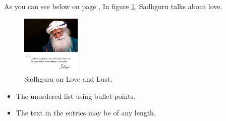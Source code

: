 \documentclass[12pt, letterpaper, twoside]{article}
\begin{document}
As you can see below on page \pageref{pic1}, In figure \ref{pic1}, Sadhguru talks about love.
\begin{figure}[t]
    \centering
    \includegraphics[width=0.25\textwidth]{love}
    \caption{Sadhguru on Love and Lust.}
    \label{pic1}
\end{figure}


\begin{itemize}
    \item The unordered list using bullet-points.
    \item The text in the entries may be of any length. 
\end{itemize}
\end{document}
